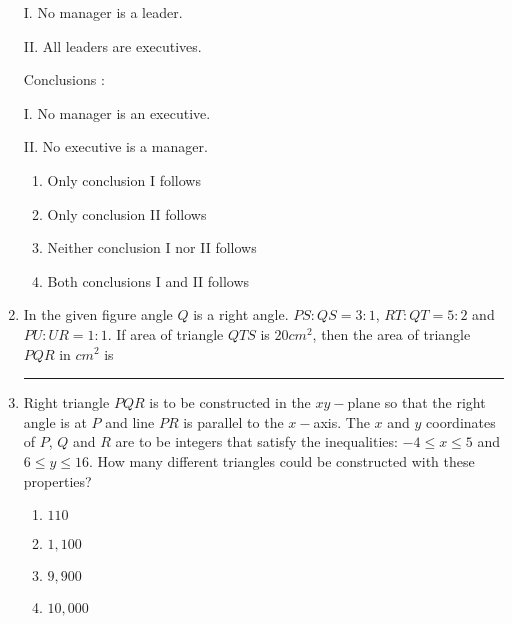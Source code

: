 \documentclass[journal]{IEEEtran}
\begin{document}
\begin{enumerate}
\textsc{I}. No manager is a leader.

\textsc{II}. All leaders are executives.

Conclusions :

\textsc{I}. No manager is an executive.

\textsc{II}. No executive is a manager.

\begin{multicols}{2}
\begin{enumerate}
\item Only conclusion \textsc{I} follows
\item Only conclusion \textsc{II} follows
\item Neither conclusion \textsc{I} nor \textsc{II} follows
\item Both conclusions \textsc{I} and \textsc{II} follows
\end{enumerate}
\end{multicols}


\item In the given figure angle $Q$ is a right angle. $PS:QS=3:1$, $RT:QT=5:2$ and $PU:UR=1:1$. If area of triangle $QTS$ is $20cm^{2}$, then the area of triangle $PQR$ in $cm^{2}$ is \rule{1cm}{0.15mm}



\item Right triangle $PQR$ is to be constructed in the $xy-$plane so that the right angle is at $P$ and line $PR$ is parallel to the $x-$axis. The $x$ and $y$ coordinates of $P$, $Q$ and $R$ are to be integers that satisfy the inequalities: $-4\leq x\leq 5$ and $6\leq y\leq 16$. How many different triangles could be constructed with these properties?
\begin{multicols}{2}
\begin{enumerate}
\item $110$
\item $1,100$
\item $9,900$
\item $10,000$
\end{enumerate}
\end{multicols}



\end{enumerate}
\end{document}
